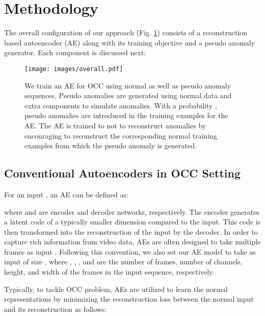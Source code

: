 \documentclass{bmvc2k}
\begin{document}
\section{Methodology}
\label{sec:methodology}
\vspace{-3mm}

The overall configuration of our approach (Fig. \ref{fig:overall}) consists of a reconstruction based autoencoder (AE) along with its training objective and a pseudo anomaly generator. Each component is discussed next:

\begin{figure}
\begin{center}
\texttt{[image: images/overall.pdf]}
\vspace{-8mm}
\end{center}
   \caption{We train an AE for OCC using normal as well as pseudo anomaly sequences. Pseudo anomalies are generated using normal data and extra components to simulate anomalies. With a probability , pseudo anomalies are introduced in the training examples for the AE. 
   The AE is trained to not to reconstruct anomalies by encouraging to reconstruct the corresponding normal training examples from which the pseudo anomaly is generated.
}
\label{fig:overall}
\vspace{-2mm}
\end{figure}

\vspace{-2mm}
\subsection{Conventional Autoencoders in OCC Setting}
\label{sec:trainingconventionalae}

For an input , an AE can be defined as:

where  and  are encoder and decoder networks, respectively. 
The encoder generates a latent code of a typically smaller dimension compared to the input. This code is then transformed into the reconstruction  of the input by the decoder. In order to capture rich information from video data, AEs are often designed to take multiple frames as input \cite{gong2019memorizing,park2020learning,hasan2016learning,zhao2017spatio}. Following this convention, we also set our AE model to take  as input of size , where , , , and  are the number of frames, number of channels, height, and width of the frames in the input sequence, respectively. 

Typically, to tackle OCC problem, AEs are utilized to learn the normal representations by
minimizing the reconstruction loss between the normal input  and its reconstruction  as follows:
\end{document}
